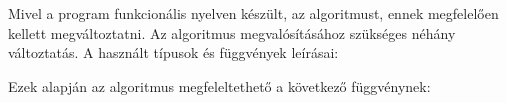 \documentclass[12pt]{article}
\begin{document}
Mivel a program funkcionális nyelven készült, az algoritmust, ennek megfelelően kellett megváltoztatni.
Az algoritmus megvalósításához szükséges néhány változtatás. A használt típusok és függvények leírásai:

\vspace{1cm}
\noindent{}
\vspace{1.5em}

Ezek alapján az algoritmus megfeleltethető a következő függvénynek: 
\end{document}
